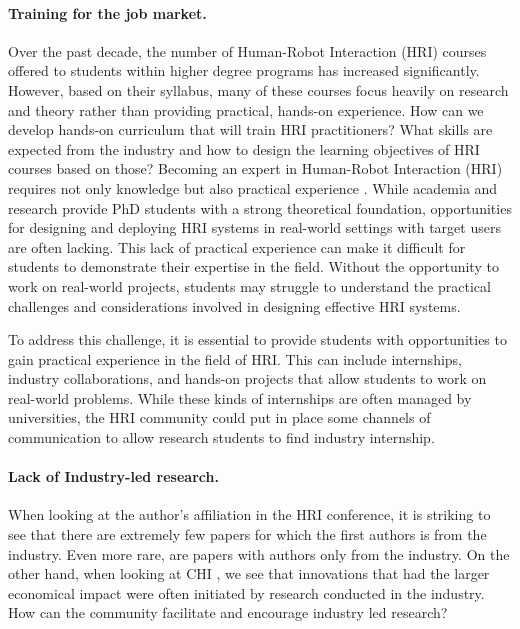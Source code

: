 \documentclass[letterpaper]{article} %
\begin{document}
\paragraph{Training for the job market.} Over the past decade, the number of Human-Robot Interaction (HRI) courses offered to students within higher degree programs has increased significantly. However, based on their syllabus, many of these courses focus heavily on research and theory rather than providing practical, hands-on experience. How can we develop hands-on curriculum that will train HRI practitioners? What skills are expected from the industry and how to design the learning objectives of HRI courses based on those? 
Becoming an expert in Human-Robot Interaction (HRI) requires not only knowledge but also practical experience \cite{lynham2002general}. While academia and research provide PhD students with a strong theoretical foundation, opportunities for designing and deploying HRI systems in real-world settings with target users are often lacking.
This lack of practical experience can make it difficult for students to demonstrate their expertise in the field. Without the opportunity to work on real-world projects, students may struggle to understand the practical challenges and considerations involved in designing effective HRI systems.

To address this challenge, it is essential to provide students with opportunities to gain practical experience in the field of HRI. This can include internships, industry collaborations, and hands-on projects that allow students to work on real-world problems. 
While these kinds of internships are often managed by universities, the HRI community could put in place some channels of communication to allow research students to find industry internship. 

\paragraph{Lack of Industry-led research.} When looking at the author's affiliation in the HRI conference, it is striking to see that there are extremely few papers for which the first authors is from the industry. Even more rare, are papers with authors only from the industry. 
On the other hand, when looking at CHI \cite{shneiderman_growth_2017}, we see that innovations that had the larger economical impact were often initiated by research conducted in the industry. 
How can the community facilitate and encourage industry led research? 
\end{document}
